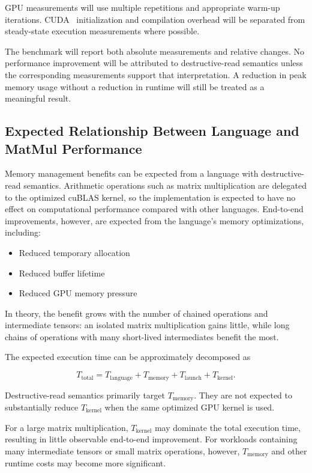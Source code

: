 \documentclass[a4paper]{article}
\begin{document}
	GPU measurements will use multiple repetitions and appropriate warm-up iterations. CUDA~\cite{CUDA} initialization and compilation overhead will be separated from steady-state execution measurements where possible.
	
	The benchmark will report both absolute measurements and relative changes. No performance improvement will be attributed to destructive-read semantics unless the corresponding measurements support that interpretation. A reduction in peak memory usage without a reduction in runtime will still be treated as a meaningful result.
	
	
	
	\subsection{Expected Relationship Between Language and MatMul Performance}
	
	Memory management benefits can be expected from a language with destructive-read semantics. Arithmetic operations such as matrix multiplication are delegated to the optimized cuBLAS kernel, so the implementation is expected to have no effect on computational performance compared with other languages. End-to-end improvements, however, are expected from the language's memory optimizations, including:
	\begin{itemize} 
		\item Reduced temporary allocation
		\item Reduced buffer lifetime
		\item Reduced GPU memory pressure
	\end{itemize}
	In theory, the benefit grows with the number of chained operations and intermediate tensors: an isolated matrix multiplication gains little, while long chains of operations with many short-lived intermediates benefit the most.
	
	The expected execution time can be approximately decomposed as
	
	\begin{equation}
		T_{\mathrm{total}} =
		T_{\mathrm{language}} +
		T_{\mathrm{memory}} +
		T_{\mathrm{launch}} +
		T_{\mathrm{kernel}}.
	\end{equation}
	
	Destructive-read semantics primarily target $T_{\mathrm{memory}}$. They are not expected to substantially reduce $T_{\mathrm{kernel}}$ when the same optimized GPU kernel is used.
	
	For a large matrix multiplication, $T_{\mathrm{kernel}}$ may dominate the total execution time, resulting in little observable end-to-end improvement. For workloads containing many intermediate tensors or small matrix operations, however, $T_{\mathrm{memory}}$ and other runtime costs may become more significant.
	
\end{document}
